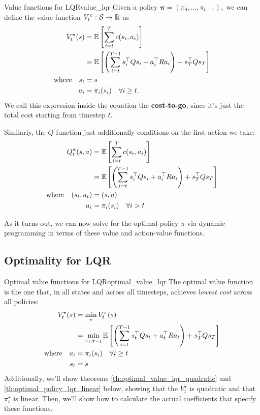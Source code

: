 \documentclass[../main/main]{subfiles}
\begin{document}
\begin{definition}{Value functions for LQR}{value_lqr}
    Given a policy $\mathbf{\pi} = (\pi_0, \dots, \pi_{t-1}),$ we can define the
    value function $V^\pi_t : \mathcal{S} \to \mathbb{R}$ as \[ \begin{split}
        V^\pi_t (s) &= \operatorname*{\mathbb{E}} \left[ \sum_{i=t}^{T} c(s_i, a_i) \right] \\
        &= \operatorname*{\mathbb{E}} \left[ \left( \sum_{i=t}^{T-1} s_i^\top Q s_i + a_i^\top R a_i \right) + s_T^\top Q s_T \right] \\
        \textrm{where} \quad s_t &= s \\
        a_i &= \pi_i(s_i) \quad \forall i \ge t.
    \end{split} \]
    We call this expression inside the equation the \textbf{cost-to-go},
    since it's just the total cost starting from timestep $t$.

    Similarly, the $Q$ function just additionally conditions on the first
    action we take: \[ \begin{split}
        Q^\pi_t (s, a) &= \operatorname*{\mathbb{E}} \left[ \sum_{i=t}^{T} c(s_i, a_i) \right] \\
        &= \operatorname*{\mathbb{E}} \left[ \left( \sum_{i=t}^{T-1} s_i^\top Q s_i + a_i^\top R a_i \right) + s_T^\top Q s_T \right] \\
        \textrm{where} \quad (s_t, a_t) &= (s, a) \\
        \quad a_i &= \pi_i(s_i) \quad \forall i > t
    \end{split} \]
\end{definition}

As it turns out, we can now solve for the optimal policy $\pi$ via dynamic
programming in terms of these value and action-value functions.

\subsection{Optimality for LQR}

\begin{definition}{Optimal value functions for LQR}{optimal_value_lqr}
    The optimal value function is the one that, in all states and across all timesteps,
    achieves \emph{lowest cost} across all policies: \[
        \begin{split}
            V^\star_t(s) &= \min_\pi V^\pi_t(s) \\
            &= \min_{\pi_{t:T-1}} \operatorname*{\mathbb{E}} \left[ \left( \sum_{i=t}^{T-1} s_t^\top Q s_t + a_t^\top R a_t \right) + s_T^\top Q s_T \right] \\
            \textrm{where} \quad a_i &= \pi_i(s_i) \quad \forall i \ge t \\
            s_t &= s
        \end{split}
    \]
    Additionally, we'll show theorems \ref{th:optimal_value_lqr_quadratic} and \ref{th:optimal_policy_lqr_linear} below,
    showing that the $V^\star_t$ is quadratic and that $\pi^\star_t$ is linear.
    Then, we'll show how to calculate the actual coefficients that specify these
    functions.
\end{definition}
\end{document}
